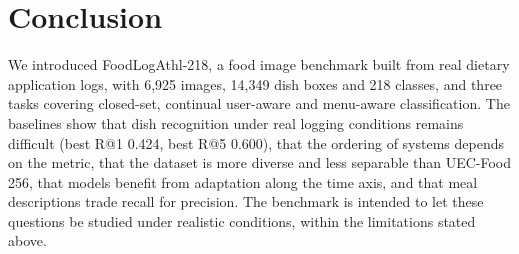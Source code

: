 \documentclass[sigconf, nonacm]{acmart}
\begin{document}
\section{Conclusion}
We introduced FoodLogAthl-218, a food image benchmark built from real dietary application logs, with 6,925 images, 14,349 dish boxes and 218 classes, and three tasks covering closed-set, continual user-aware and menu-aware classification. The baselines show that dish recognition under real logging conditions remains difficult (best R@1 0.424, best R@5 0.600), that the ordering of systems depends on the metric, that the dataset is more diverse and less separable than UEC-Food 256, that models benefit from adaptation along the time axis, and that meal descriptions trade recall for precision. The benchmark is intended to let these questions be studied under realistic conditions, within the limitations stated above.




\end{document}
